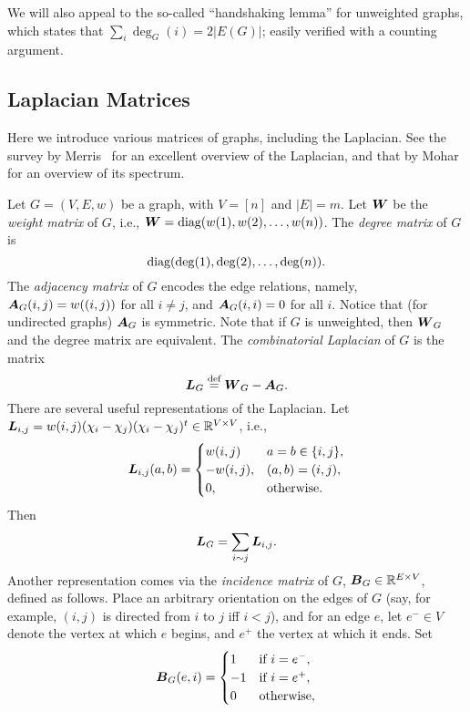 We will also appeal to the so-called ``handshaking lemma'' for unweighted graphs, which states that $\sum_i \deg_G(i) = 2|E(G)|$; easily verified with a counting argument. 


\subsection{Laplacian Matrices}
\label{sec:background_laplacian}
Here we introduce various matrices of graphs, including the Laplacian. See  the survey by Merris~\cite{merris1994laplacian} for an excellent overview of the Laplacian, and that by Mohar~\cite{mohar1991laplacian} for an overview of its spectrum. 


Let $G=(V,E,w)$ be a graph, with $V=[n]$ and $|E|=m$. 
Let $\vb*{W}$ be the \emph{weight matrix} of $G$, i.e., $\vb*{W}=\text{diag}(w(1),w(2),\dots,w(n))$. 
The \emph{degree matrix} of $G$ is \[\text{diag}(\deg(1),\deg(2),\dots,\deg(n)).\] The \emph{adjacency matrix} of $G$ encodes the edge relations, namely, $\vb*{A}_G(i,j)=w((i,j))$ for all $i\neq j$, and $\vb*{A}_G(i,i)=0$ for all $i$. Notice that (for undirected graphs) $\vb*{A}_G$ is symmetric.  Note that if $G$ is unweighted, then $\vb*{W}_G$ and the degree matrix are equivalent. 
The \emph{combinatorial Laplacian} of $G$ is the matrix 
\begin{equation}
\label{eq:L_G}
\vb*{L}_G\overset{\text{def}}{=} \vb*{W}_G-\vb*{A}_G.
\end{equation}
There are several useful representations of the Laplacian. Let $\vb*{L}_{i,j}=w(i,j)(\chi_i-\chi_j) (\chi_i-\chi_j)^t\in \mathbb{R}^{V\times V}$, i.e., 
\[\vb*{L}_{i,j}(a,b)=\begin{cases}
w(i,j)&a=b\in\{i,j\},\\
-w(i,j),&(a,b)=(i,j),\\
0,&\text{otherwise}.
\end{cases}\]
Then 
\begin{equation}
\label{eq:Lsum}
    \vb*{L}_G=\sum_{i\sim j}\vb*{L}_{i,j}.
\end{equation}
Another representation comes via the \emph{incidence matrix} of $G$, $\vb*{B}_G\in \mathbb{R}^{E\times V}$, defined as follows. Place an arbitrary orientation on the edges of $G$ (say, for example, $(i,j)$ is directed from $i$ to $j$ iff $i<j$), and for an edge $e$, let $e^-\in V$ denote the vertex at which $e$ begins, and $e^+$ the vertex at which it ends. Set 
\begin{equation}
\label{eq:B_G}
\vb*{B}_G(e,i)=\begin{cases}
1&\text{if }i=e^-,\\
-1&\text{if }i=e^+,\\
0&\text{otherwise},
\end{cases}
\end{equation}
